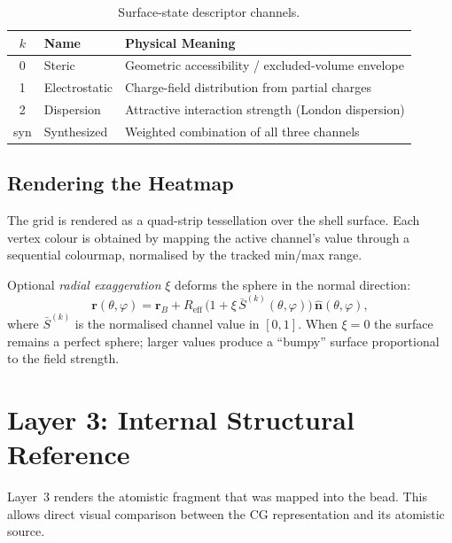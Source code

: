\documentclass[12pt, a4paper, oneside]{article}
\newcommand{\Rvec}{\bm{r}}
\newcommand{\nhat}{\hat{\bm{n}}}
\begin{document}
\begin{table}[htbp]
  \centering
  \caption{Surface-state descriptor channels.}
  \label{tab:channels}
  \begin{tabular}{clp{7.5cm}}
    \toprule
    $k$ & Name & Physical Meaning \\
    \midrule
    0 & Steric        & Geometric accessibility / excluded-volume envelope \\
    1 & Electrostatic & Charge-field distribution from partial charges \\
    2 & Dispersion    & Attractive interaction strength (London dispersion) \\
    syn & Synthesized  & Weighted combination of all three channels \\
    \bottomrule
  \end{tabular}
\end{table}

\subsection{Rendering the Heatmap}

The grid is rendered as a quad-strip tessellation over the shell
surface.  Each vertex colour is obtained by mapping the active
channel's value through a sequential colourmap, normalised by the
tracked min/max range.

Optional \emph{radial exaggeration} $\xi$ deforms the sphere in the
normal direction:
\begin{equation}
  \Rvec(\theta, \varphi)
    = \Rvec_B + R_{\text{eff}} \,
      \bigl(1 + \xi \, \bar{S}^{(k)}(\theta,\varphi)\bigr) \,
      \nhat(\theta, \varphi),
  \label{eq:radial_exag}
\end{equation}
where $\bar{S}^{(k)}$ is the normalised channel value in $[0,1]$.
When $\xi = 0$ the surface remains a perfect sphere; larger values
produce a ``bumpy'' surface proportional to the field strength.

\section{Layer 3: Internal Structural Reference}

Layer~3 renders the atomistic fragment that was mapped into the bead.
This allows direct visual comparison between the CG representation and
its atomistic source.
\end{document}
